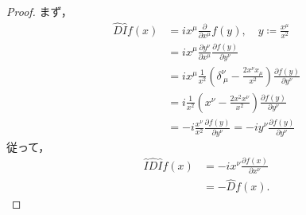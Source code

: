 \begin{proof}
	まず，
	\begin{align}
		\hat{D}\hat{I}f(x) & =ix^{\mu}\frac{\partial}{\partial{}x^{\mu}}f(y),\quad{}y\coloneqq{}\frac{x^{\mu}}{x^{2}}                                        \\
		                   & =ix^{\mu}\frac{\partial{}y^{\nu}}{\partial{}x^{\mu}}\frac{\partial{}f(y)}{\partial{}y^{\nu}}                                    \\
		                   & =ix^{\mu}\frac{1}{x^{2}}\left(\delta^{\nu}_{\ \mu}-\frac{2x^{\nu}x_{\mu}}{x^{2}}\right)\frac{\partial{}f(y)}{\partial{}y^{\nu}} \\
		                   & =i\frac{1}{x^{2}}\left(x^{\nu}-\frac{2x^{2}x^{\nu}}{x^{2}}\right)\frac{\partial{}f(y)}{\partial{}y^{\nu}}                       \\
		                   & =-i\frac{x^{\nu}}{x^{2}}\frac{\partial{}f(y)}{\partial{}y^{\nu}}=-iy^{\nu}\frac{\partial{}f(y)}{\partial{}y^{\nu}}
	\end{align}
	従って，
	\begin{align}
		\hat{I}\hat{D}\hat{I}f(x) & =-ix^{\nu}\frac{\partial{}f(x)}{\partial{}x^{\nu}} \\
		                          & =-\hat{D}f(x).
	\end{align}
\end{proof}
